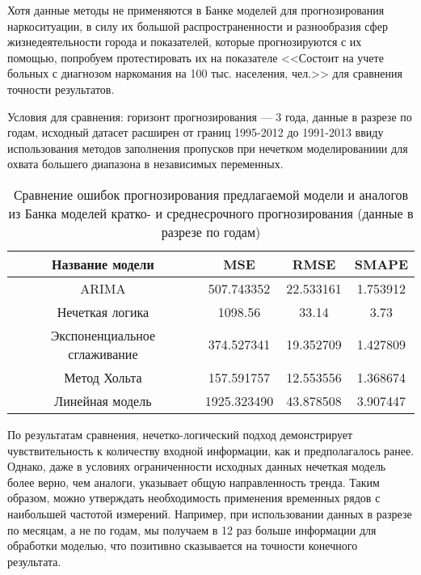 Хотя данные методы не применяются в Банке моделей для прогнозирования
наркоситуации, в силу их большой распространенности и разнообразия сфер
жизнедеятельности города и показателей, которые прогнозируются с их помощью,
попробуем протестировать их на показателе <<Состоит на учете больных с диагнозом
наркомания на 100 тыс. населения, чел.>> для сравнения точности результатов.

Условия для сравнения: горизонт прогнозирования --- 3 года, данные в разрезе по
годам, исходный датасет расширен от границ 1995-2012 до 1991-2013 ввиду
использования методов заполнения пропусков при нечетком моделированиии для
охвата большего диапазона в независимых переменных.

\begin{table}[bhtp]
    \caption{Сравнение ошибок прогнозирования предлагаемой модели и аналогов из
        Банка моделей кратко- и среднесрочного прогнозирования (данные в разрезе
        по годам)}
        \begin{tabular}{ | c | c | c | c | }
            \hline
            Название модели & MSE & RMSE & SMAPE \\
            \hline
            ARIMA & 507.743352 & 22.533161 & 1.753912\\
            \hline
            Нечеткая логика & 1098.56 & 33.14 & 3.73 \\
            \hline
            Экспоненциальное сглаживание & 374.527341 & 19.352709 & 1.427809\\
            \hline
            Метод Хольта & 157.591757 & 12.553556 & 1.368674\\
            \hline
            Линейная модель & 1925.323490 & 43.878508 & 3.907447\\
            \hline
        \end{tabular}
    \label{table:short_model_comparison}
\end{table}

По результатам сравнения, нечетко-логический подход демонстрирует
чувствительность к количеству входной информации, как и предполагалось ранее.
Однако, даже в условиях ограниченности исходных данных нечеткая модель более
верно, чем аналоги, указывает общую направленность тренда. Таким образом, можно
утверждать необходимость применения временных рядов с наибольшей частотой
измерений. Например, при использовании данных в разрезе по месяцам, а не по
годам, мы получаем в 12 раз больше информации для обработки моделью, что
позитивно сказывается на точности конечного результата.


